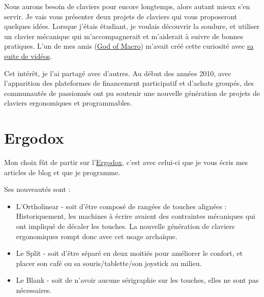 \documentclass[a4paper,11pt]{article}
\title{
  \blogtitle{Des claviers métals}
}
\author{}
\date{}
\begin{document}

\maketitle

\thispagestyle{first}
\begin{blogmain}
Nous aurons besoin de claviers pour encore longtemps, alors autant mieux s'en servir. Je vais vous présenter deux projets de claviers qui vous proposeront quelques idées.
Lorsque j’étais étudiant, je voulais découvrir la soudure, et utiliser un clavier mécanique qui m’accompagnerait et m’aiderait à suivre de bonnes pratiques.
L'un de mes amis (\href{https://www.youtube.com/@GodOfMacro}{God of Macro}) m'avait créé cette curiosité avec \href{https://www.youtube.com/watch?v=7qXSbcSMR0E}{sa suite de vidéos}.

Cet intérêt, je l'ai partagé avec d'autres.
Au début des années 2010, avec l'apparition des plateformes de financement participatif et d'achats groupés, des communautés de passionnés ont pu soutenir une nouvelle génération de projets de claviers ergonomiques et programmables.

\section{Ergodox}
Mon choix fût de partir sur l'\href{https://geekhack.org/index.php?topic=39107.0}{Ergodox}, c'est avec celui-ci que je vous écris mes articles de blog et que je programme.


\newpage

Ses nouveautés sont :
\begin{itemize}
  \item L'Ortholinear - soit d'être composé de rangées de touches alignées : Historiquement, les machines à écrire avaient des contraintes mécaniques qui ont impliqué de décaler les touches. La nouvelle génération de claviers ergonomiques rompt donc avec cet usage archaïque.
  \item Le Split - soit d'être séparé en deux moitiés pour améliorer le confort, et placer son café ou sa souris/tablette/son joystick au milieu.
  \item Le Blank - soit de n'avoir aucune sérigraphie sur les touches, elles ne sont pas nécessaires.
\end{itemize}


\end{blogmain}
\end{document}
